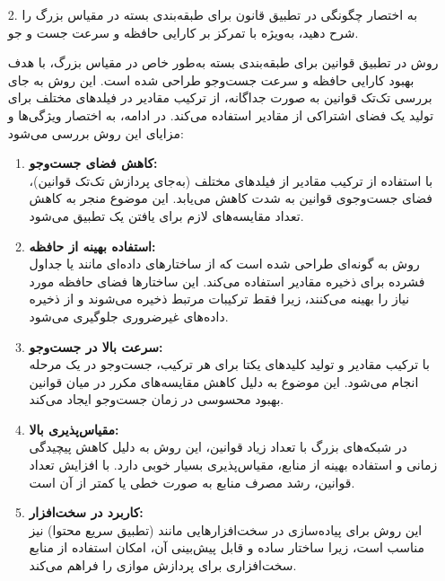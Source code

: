 \begin{enumerate}
	\item [2. ]
	به اختصار چگونگی  در تطبیق قانون برای طبقه‌بندی بسته در مقیاس بزرگ را شرح دهید، به‌ویژه با تمرکز بر کارایی حافظه و سرعت جست و جو.
	\begin{qsolve}
		روش  در تطبیق قوانین برای طبقه‌بندی بسته به‌طور خاص در مقیاس بزرگ، با هدف بهبود کارایی حافظه و سرعت جست‌وجو طراحی شده است. این روش به جای بررسی تک‌تک قوانین به صورت جداگانه، از ترکیب مقادیر در فیلدهای مختلف برای تولید یک فضای اشتراکی از مقادیر استفاده می‌کند. در ادامه، به اختصار ویژگی‌ها و مزایای این روش بررسی می‌شود:
		
		\begin{enumerate}
			\item \textbf{کاهش فضای جست‌وجو:}\\
			با استفاده از ترکیب مقادیر از فیلدهای مختلف (به‌جای پردازش تک‌تک قوانین)، فضای جست‌وجوی قوانین به شدت کاهش می‌یابد. این موضوع منجر به کاهش تعداد مقایسه‌های لازم برای یافتن یک تطبیق می‌شود.
			
			
			\item \textbf{استفاده بهینه از حافظه:}\\
			روش  به گونه‌ای طراحی شده است که از ساختارهای داده‌ای مانند  یا جداول فشرده برای ذخیره مقادیر استفاده می‌کند. این ساختارها فضای حافظه مورد نیاز را بهینه می‌کنند، زیرا فقط ترکیبات مرتبط ذخیره می‌شوند و از ذخیره داده‌های غیرضروری جلوگیری می‌شود.
			
			
			
			\item \textbf{سرعت بالا در جست‌وجو:}\\
			با ترکیب مقادیر و تولید کلیدهای یکتا برای هر ترکیب، جست‌وجو در یک مرحله انجام می‌شود. این موضوع به دلیل کاهش مقایسه‌های مکرر در میان قوانین بهبود محسوسی در زمان جست‌وجو ایجاد می‌کند.
			
			
			
			\item \textbf{مقیاس‌پذیری بالا:}\\
			در شبکه‌های بزرگ با تعداد زیاد قوانین، این روش به دلیل کاهش پیچیدگی زمانی و استفاده بهینه از منابع، مقیاس‌پذیری بسیار خوبی دارد. با افزایش تعداد قوانین، رشد مصرف منابع به صورت خطی یا کمتر از آن است.
			
			
			
			\item \textbf{کاربرد در سخت‌افزار:}\\
			این روش برای پیاده‌سازی در سخت‌افزارهایی مانند  (تطبیق سریع محتوا) نیز مناسب است، زیرا ساختار ساده و قابل پیش‌بینی آن، امکان استفاده از منابع سخت‌افزاری برای پردازش موازی را فراهم می‌کند.
		\end{enumerate}
	\end{qsolve}
	

\end{enumerate}
